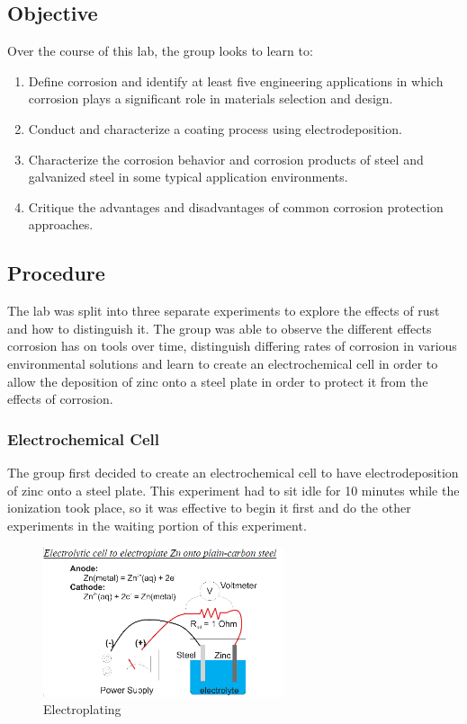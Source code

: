 \documentclass{article}
\begin{document}
\subsection{Objective}
Over the course of this lab, the group looks to learn to:
\begin{enumerate}
	\item Define corrosion and identify at least five engineering applications in which corrosion plays a significant role in materials selection and design. 
	\item Conduct and characterize a coating process using electrodeposition. 
	\item Characterize the corrosion behavior and corrosion products of steel and galvanized steel in some typical application environments. 
	\item Critique the advantages and disadvantages of common corrosion protection approaches.
\end{enumerate}

\subsection{Procedure}
The lab was split into three separate experiments to explore the effects of rust and how to distinguish it. The group was able to observe the different effects corrosion has on tools over time, distinguish differing rates of corrosion in various environmental solutions and learn to create an electrochemical cell in order to allow the deposition of zinc onto a steel plate in order to protect it from the effects of corrosion.   

\subsubsection{Electrochemical Cell}
The group first decided to create an electrochemical cell to have electrodeposition of zinc onto a steel plate. This experiment had to sit idle for 10 minutes while the ionization took place, so it was effective to begin it first and do the other experiments in the waiting portion of this experiment.

\begin{figure}[ht]
\caption{Electroplating}
\centering
\includegraphics[width=200pt]{Electroplating.png}
\end{figure}
\end{document}
